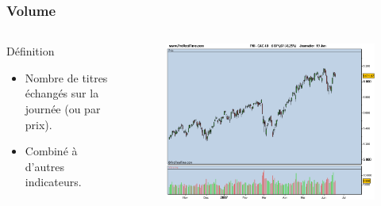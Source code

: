 \begin{frame}
    \frametitle{Volume}
    \begin{columns}
	\begin{column}{4cm}
	  \begin{block}{Définition}
		  \begin{itemize}
			  \item Nombre de titres échangés sur la journée (ou par prix).
			  \item Combiné à d'autres indicateurs.
		  \end{itemize}
	  \end{block}
	\end{column}
	\begin{column}{6cm}
	  \begin{figure}
	      \includegraphics[scale=0.22]{images/volumeBarre.png}   
	  \end{figure}   
	\end{column}
    \end{columns}
\end{frame}
